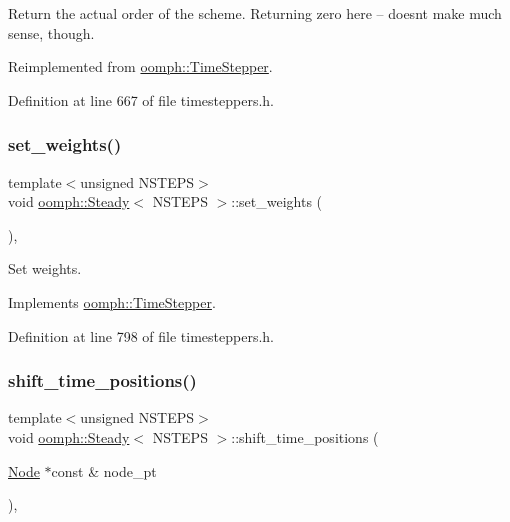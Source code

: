 Return the actual order of the scheme. Returning zero here -- doesn\textquotesingle{}t make much sense, though. 



Reimplemented from \hyperlink{classoomph_1_1TimeStepper_a251e5d4b37381e582b7cf4c554e2e724}{oomph\+::\+Time\+Stepper}.



Definition at line 667 of file timesteppers.\+h.

\mbox{\label{classoomph_1_1Steady_a2a00515fba0cfe35d486ea2bbb5af99c}} 
\subsubsection{\texorpdfstring{set\+\_\+weights()}{set\_weights()}}
{\footnotesize\ttfamily template$<$unsigned N\+S\+T\+E\+PS$>$ \\
void \hyperlink{classoomph_1_1Steady}{oomph\+::\+Steady}$<$ N\+S\+T\+E\+PS $>$\+::set\+\_\+weights (\begin{DoxyParamCaption}{ }\end{DoxyParamCaption})\hspace{0.3cm}{\ttfamily [inline]}, {\ttfamily [virtual]}}



Set weights. 



Implements \hyperlink{classoomph_1_1TimeStepper_a028fa3a8d3c6db6b0ddf580cb0468d55}{oomph\+::\+Time\+Stepper}.



Definition at line 798 of file timesteppers.\+h.

\mbox{\label{classoomph_1_1Steady_a4b3c9877146cb5a3673b54e0f02d9625}} 
\subsubsection{\texorpdfstring{shift\+\_\+time\+\_\+positions()}{shift\_time\_positions()}}
{\footnotesize\ttfamily template$<$unsigned N\+S\+T\+E\+PS$>$ \\
void \hyperlink{classoomph_1_1Steady}{oomph\+::\+Steady}$<$ N\+S\+T\+E\+PS $>$\+::shift\+\_\+time\+\_\+positions (\begin{DoxyParamCaption}\item[{\hyperlink{classoomph_1_1Node}{Node} $\ast$const \&}]{node\+\_\+pt }\end{DoxyParamCaption})\hspace{0.3cm}{\ttfamily [inline]}, {\ttfamily [virtual]}}



